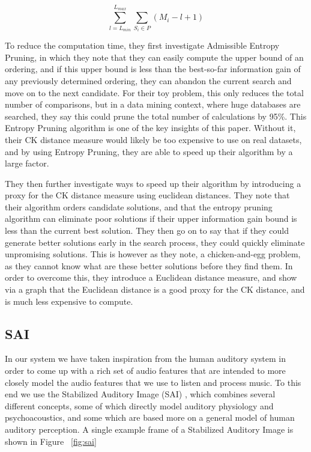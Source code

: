\documentclass[12pt,oneside]{book}
\begin{document}
	\[ \sum^{L_{max}}_{l=L_{min}} \sum_{S_i \in { P }} (M_i - l + 1) \]

To reduce the computation time, they first investigate Admissible
Entropy Pruning, in which they note that they can easily compute the
upper bound of an ordering, and if this upper bound is less than the
best-so-far information gain of any previously determined ordering,
they can abandon the current search and move on to the next candidate.
For their toy problem, this only reduces the total number of
comparisons, but in a data mining context, where huge databases are
searched, they say this could prune the total number of calculations
by 95\%.  This Entropy Pruning algorithm is one of the key insights of
this paper.  Without it, their CK distance measure would likely be too
expensive to use on real datasets, and by using Entropy Pruning, they
are able to speed up their algorithm by a large factor.

They then further investigate ways to speed up their algorithm by
introducing a proxy for the CK distance measure using euclidean
distances.  They note that their algorithm orders candidate solutions,
and that the entropy pruning algorithm can eliminate poor solutions if
their upper information gain bound is less than the current best
solution.  They then go on to say that if they could generate better
solutions early in the search process, they could quickly eliminate
unpromising solutions.  This is however as they note, a
chicken-and-egg problem, as they cannot know what are these better
solutions before they find them.  In order to overcome this, they
introduce a Euclidean distance measure, and show via a graph that the
Euclidean distance is a good proxy for the CK distance, and is much
less expensive to compute.


\subsection{SAI}

In our system we have taken inspiration from the human auditory system
in order to come up with a rich set of audio features that are
intended to more closely model the audio features that we use to
listen and process music.  To this end we use the Stabilized Auditory
Image (SAI) \cite{lyon1990} \cite{patterson2000}, which combines
several different concepts, some of which directly model auditory
physiology and psychoacoustics, and some which are based more on a
general model of human auditory perception.  A single example frame of
a Stabilized Auditory Image is shown in Figure ~\ref{fig:sai}
\end{document}
